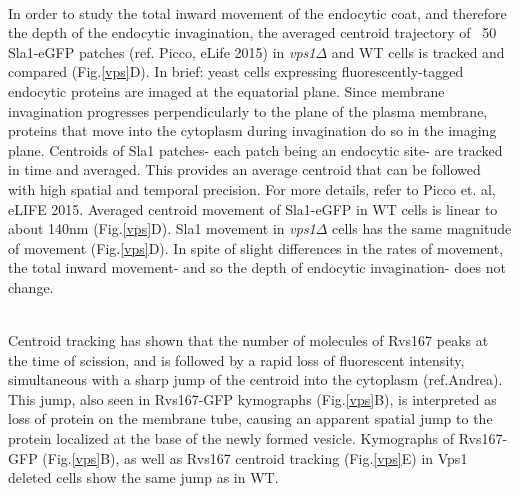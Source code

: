 \documentclass[9pt,lineno]{elife}
\begin{document}
~\\

In order to study the total inward movement of the endocytic coat, and therefore the depth of the endocytic invagination, the averaged centroid trajectory of ~50 Sla1-eGFP patches (ref. Picco, eLife 2015) in \textit{vps1$\Delta$} and WT cells is tracked and compared (Fig.\ref{vps}D). In brief: yeast cells expressing fluorescently-tagged endocytic proteins are imaged at the equatorial plane. Since membrane invagination progresses perpendicularly to the plane of the plasma membrane, proteins that move into the cytoplasm during invagination do so in the imaging plane. Centroids of Sla1 patches- each patch being an endocytic site- are tracked in time and averaged. This provides an average centroid that can be followed with high spatial and temporal precision. For more details, refer to Picco et. al, eLIFE 2015. Averaged centroid movement of Sla1-eGFP in WT cells is linear to about 140nm (Fig.\ref{vps}D). Sla1 movement in \textit{vps1$\Delta$} cells has the same magnitude of movement (Fig.\ref{vps}D). In spite of slight differences in the rates of movement, the total inward movement- and so the depth of endocytic invagination- does not change. 


~\\

Centroid tracking has shown that the number of molecules of Rvs167 peaks at the time of scission, and is followed by a rapid loss of fluorescent intensity, simultaneous with a sharp jump of the centroid into the cytoplasm (ref.Andrea). This jump, also seen in Rvs167-GFP kymographs (Fig.\ref{vps}B), is interpreted as loss of protein on the membrane tube, causing an apparent spatial jump to the protein localized at the base of the newly formed vesicle. Kymographs of Rvs167-GFP (Fig.\ref{vps}B), as well as Rvs167 centroid tracking (Fig.\ref{vps}E) in Vps1 deleted cells show the same jump as in WT. 

~\\
\end{document}
